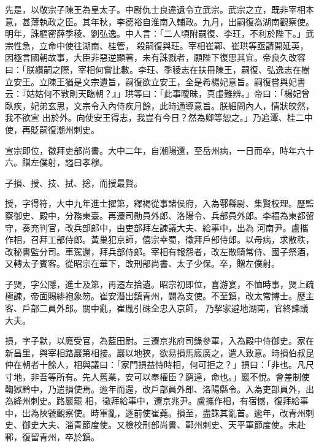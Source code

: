 \begin{pinyinscope}
 先是，以敬宗子陳王為皇太子。中尉仇士良違遺令立武宗。武宗之立，既非宰相本意，甚薄執政之臣。其年秋，李德裕自淮南入輔政。九月，出嗣復為湖南觀察使。明年，誅樞密薛季稜、劉弘逸。中人言：「二人頃附嗣復、李玨，不利於陛下。」武宗性急，立命中使往湖南、桂管，
 殺嗣復與玨。宰相崔鄲、崔珙等亟請開延英，因極言國朝故事，大臣非惡逆顯著，未有誅戮者，願陛下復思其宜。帝良久改容曰：「朕纘嗣之際，宰相何嘗比數。李玨、季稜志在扶冊陳王，嗣復、弘逸志在樹立安王。立陳王猶是文宗遺旨，嗣復欲立安王，全是希楊妃意旨。嗣復嘗與妃書云：『姑姑何不敩則天臨朝？』」珙等曰：「此事曖昧，真虛難辨。」帝曰：「楊妃曾臥疾，妃弟玄思，文宗令入內侍疾月餘，此時通導意旨。朕細問內人，情狀皎然，我不欲宣
 出於外。向使安王得志，我豈有今日？然為卿等恕之。」乃追潭、桂二中使，再貶嗣復潮州刺史。



 宣宗即位，徵拜吏部尚書。大中二年，自潮陽還，至岳州病，一日而卒，時年六十六。贈左僕射，謚曰孝穆。



 子損、授、技、拭、捴，而授最賢。



 授，字得符，大中九年進士擢第，釋褐從事諸侯府，入為鄠縣尉、集賢校理。歷監察御史、殿中，分務東臺。再遷司勛員外郎、洛陽令、兵部員外郎。李福為東都留守，奏充判官，改兵部郎中，由吏部拜左諫議大夫、給事中，出為
 河南尹。盧攜作相，召拜工部侍郎。黃巢犯京師，僖宗幸蜀，徵拜戶部侍郎。以母病，求散秩，改秘書監分司。車駕還，拜兵部侍郎。宰相有報怨者，改左散騎常侍、國子祭酒，又轉太子賓客。從昭宗在華下，改刑部尚書、太子少保。卒，贈左僕射。



 子煚，字公隱，進士及第，再遷左拾遺。昭宗初即位，喜游宴，不恤時事，煚上疏極諫，帝面賜緋袍象笏。崔安潛出鎮青州，闢為支使。不至鎮，改太常博士。歷主客、戶部二員外郎。關中亂，崔胤引硃全忠入京師，
 乃挈家避地湖南，官終諫議大夫。



 損，字子默，以廕受官，為藍田尉。三遷京兆府司錄參軍，入為殿中侍御史。家在新昌里，與宰相路巖第相接。巖以地狹，欲易損馬廄廣之，遣人致意。時損伯叔昆仲在朝者十餘人，相與議曰：「家門損益恃時相，何可拒之？」損曰：「非也。凡尺寸地，非吾等所有。先人舊業，安可以奉權臣？窮達，命也。」巖不悅。會差制使鞫獄黔中，乃遣損使焉。逾年而還，改戶部員外郎、洛陽縣令。入為吏部員外，出為絳州刺史。路巖罷
 相，徵拜給事中，遷京兆尹。盧攜作相，有宿憾，復拜給事中，出為陜虢觀察使。時軍亂，逐前使崔蕘。損至，盡誅其亂首。逾年，改青州刺史、御史大夫、淄青節度使。又檢校刑部尚書、鄆州刺史、天平軍節度使。未赴鄆，復留青州，卒於鎮。




\end{pinyinscope}
